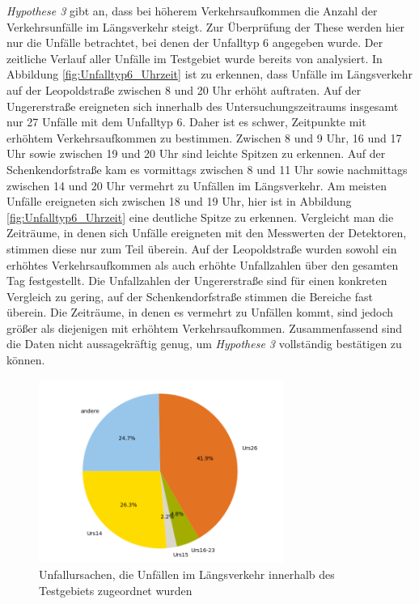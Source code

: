 \textit{Hypothese 3} gibt an, dass bei höherem Verkehrsaufkommen die Anzahl der Verkehrsunfälle im Längsverkehr steigt. Zur Überprüfung der These werden hier nur die Unfälle betrachtet, bei denen der Unfalltyp 6 angegeben wurde. Der zeitliche Verlauf aller Unfälle im Testgebiet wurde bereits von \Textcite[S. 10-16]{Bruhn.2018} analysiert. In Abbildung \ref{fig:Unfalltyp6_Uhrzeit} ist zu erkennen, dass Unfälle im Längsverkehr auf der Leopoldstraße zwischen 8 und 20 Uhr erhöht auftraten. Auf der Ungererstraße ereigneten sich innerhalb des Untersuchungszeitraums insgesamt nur 27 Unfälle mit dem Unfalltyp 6. Daher ist es schwer, Zeitpunkte mit erhöhtem Verkehrsaufkommen zu bestimmen. Zwischen 8 und 9 Uhr, 16 und 17 Uhr sowie zwischen 19 und 20 Uhr sind leichte Spitzen zu erkennen. Auf der Schenkendorfstraße kam es vormittags zwischen 8 und 11 Uhr sowie nachmittags zwischen 14 und 20 Uhr vermehrt zu Unfällen im Längsverkehr. Am meisten Unfälle ereigneten sich zwischen 18 und 19 Uhr, hier ist in Abbildung \ref{fig:Unfalltyp6_Uhrzeit} eine deutliche Spitze zu erkennen. Vergleicht man die Zeiträume, in denen sich Unfälle ereigneten mit den Messwerten der Detektoren, stimmen diese nur zum Teil überein. Auf der Leopoldstraße wurden sowohl ein erhöhtes Verkehrsaufkommen als auch erhöhte Unfallzahlen über den gesamten Tag festgestellt. Die Unfallzahlen der Ungererstraße sind für einen konkreten Vergleich zu gering, auf der Schenkendorfstraße stimmen die Bereiche fast überein. Die Zeiträume, in denen es vermehrt zu Unfällen kommt, sind jedoch größer als diejenigen mit erhöhtem Verkehrsaufkommen. Zusammenfassend sind die Daten nicht aussagekräftig genug, um \textit{Hypothese 3} vollständig bestätigen zu können.

\begin{savenotes}
	\begin{figure}[H]
		\centering
		\includegraphics[width=8cm,height=6cm]{figures/Urs_Typ6}
		\caption[Unfallursachen, die Unfällen im Längsverkehr innerhalb des Testgebiets zugeordnet wurden]{Unfallursachen, die Unfällen im Längsverkehr innerhalb des Testgebiets zugeordnet wurden}\label{fig:Unfallursachen_Unfalltyp6}
	\end{figure}
\end{savenotes}

